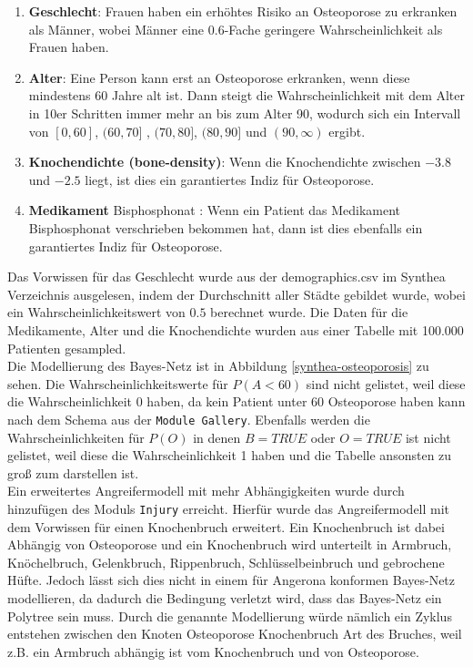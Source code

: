 \documentclass[german,version-2020-11]{uzl-thesis}
\begin{document}
\begin{enumerate}
	\item \textbf{Geschlecht}: Frauen haben ein erhöhtes Risiko an Osteoporose zu erkranken als Männer, wobei Männer eine $0.6$-Fache geringere Wahrscheinlichkeit als Frauen haben.
	\item \textbf{Alter}: Eine Person kann erst an Osteoporose erkranken, wenn diese mindestens 60 Jahre alt ist. Dann steigt die Wahrscheinlichkeit mit dem Alter in 10er Schritten immer mehr an bis zum Alter 90, wodurch sich ein Intervall von $[0,60]$, $(60,70]$ , $(70,80]$, $(80,90]$ und $(90,\infty)$ ergibt.
	\item \textbf{Knochendichte (bone-density)}: Wenn die Knochendichte zwischen $-3.8$ und $-2.5$ liegt, ist dies ein garantiertes Indiz für Osteoporose.
	\item \textbf{Medikament} Bisphosphonat : Wenn ein Patient das Medikament Bisphosphonat verschrieben bekommen hat, dann ist dies ebenfalls ein garantiertes Indiz für Osteoporose.
\end{enumerate} 
Das Vorwissen für das Geschlecht wurde aus der demographics.csv im Synthea Verzeichnis ausgelesen, indem der Durchschnitt aller Städte gebildet wurde, wobei ein Wahrscheinlichkeitswert von $0.5$ berechnet wurde. Die Daten für die Medikamente, Alter und die Knochendichte wurden aus einer Tabelle mit 100.000 Patienten gesampled. 
\\ 
Die Modellierung des Bayes-Netz ist in Abbildung \ref{synthea-osteoporosis} zu sehen. Die Wahrscheinlichkeitswerte für $P(A < 60)$ sind nicht gelistet, weil diese die Wahrscheinlichkeit 0 haben, da kein Patient unter 60 Osteoporose haben kann nach dem Schema aus der \texttt{Module Gallery}. Ebenfalls werden die Wahrscheinlichkeiten für $P(O)$ in denen $B=TRUE$ oder $O=TRUE$ ist nicht gelistet, weil diese die Wahrscheinlichkeit 1 haben und die Tabelle ansonsten zu groß zum darstellen ist.\\
Ein erweitertes Angreifermodell mit mehr Abhängigkeiten wurde durch hinzufügen des Moduls \texttt{Injury} erreicht. Hierfür wurde das Angreifermodell mit dem Vorwissen für einen Knochenbruch erweitert. Ein Knochenbruch ist dabei Abhängig von Osteoporose und ein Knochenbruch wird unterteilt in Armbruch, Knöchelbruch, Gelenkbruch, Rippenbruch, Schlüsselbeinbruch und gebrochene Hüfte. Jedoch lässt sich dies nicht in einem für Angerona konformen Bayes-Netz modellieren, da dadurch die Bedingung verletzt wird, dass das Bayes-Netz ein Polytree sein muss. Durch die genannte Modellierung würde nämlich ein Zyklus entstehen zwischen den Knoten Osteoporose \leftrightarrow Knochenbruch \leftrightarrow Art des Bruches, weil z.B. ein Armbruch abhängig ist vom Knochenbruch und von Osteoporose. 
\end{document}
